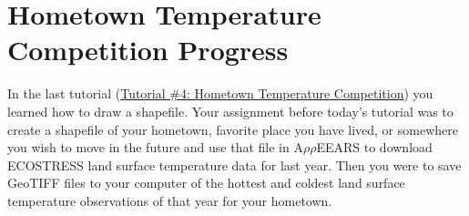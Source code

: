\documentclass[oneside,a4paper,11pt,explicit]{book}
\begin{document}
	\noindent{}
	
	\vspace{1 em}

	\section{Hometown Temperature Competition Progress}

In the last tutorial (\href{https://jeremydforsythe.github.io/icecream-tutorials/Tutorial4_TemperatureCompetition/Tutorial4_TemperatureCompetition.pdf}{Tutorial \#4: Hometown Temperature Competition}) you learned how to draw a shapefile. Your assignment before today's tutorial was to create a shapefile of your hometown, favorite place you have lived, or somewhere you wish to move in the future and use that file in A$\rho\rho$EEARS to download ECOSTRESS land surface temperature data for last year. Then you were to save GeoTIFF files to your computer of the hottest and coldest land surface temperature observations of that year for your hometown.
\end{document}
